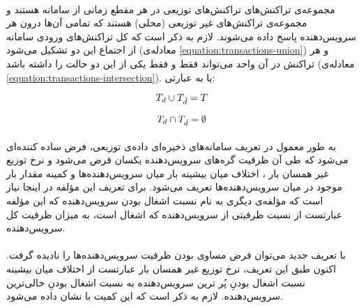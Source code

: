 \paragraph*{}
مجموعه‌ی تراکنش‌های
\lr{$ \distributedTransactions $}
تراکنش‌های توزیعی در هر مقطع زمانی از سامانه هستند و مجموعه‌ی
\lr{$ \nonDistributedTransactions $}
تراکنش‌های غیر توزیعی (محلی) هستند که تمامی آن‌ها درون هر سرویس‌دهنده پاسخ داده می‌شوند. لازم به ذکر است که کل تراکنش‌های ورودی سامانه از اجتماع این دو تشکیل می‌شود (معادله‌ی
\ref{equation:transactions-union})
و هر تراکنش در آن واحد می‌تواند فقط و فقط یکی از این دو حالت را داشته باشد (معادله‌ی
\ref{equation:transactions-intersection}).
یا به عبارتی:

\begin{latin}
	\begin{equation} \label{equation:transactions-union}
		T_{d} \cup T_{\hat{d}} = T
	\end{equation}
\end{latin}

\begin{latin}
	\begin{equation} \label{equation:transactions-intersection}
		T_{d} \cap T_{\hat{d}} = \emptyset
	\end{equation}
\end{latin}

\paragraph*{}
به طور معمول در تعریف سامانه‌های ذخیره‌ای داده‌ی توزیعی، فرض ساده کننده‌ای می‌شود که طی آن ظرفیت گره‌های سرویس‌دهنده یکسان فرض می‌شود و نرخ توزیع غیر همسان بار
،
اختلاف میان بیشینه بار میان سرویس‌دهنده‌ها و کمینه مقدار بار موجود در میان سرویس‌دهنده‌ها تعریف می‌شود. برای تعریف این مؤلفه در اینجا نیاز است که مؤلفه‌ی دیگری به نام نسبت اشغال بودن سرویس‌دهنده که این مؤلفه عبارتست از نسبت ظرفیتی از سرویس‌دهنده که اشغال است، به میزان ظرفیت کل سرویس‌دهنده.

\paragraph*{}
با تعریف جدید می‌توان فرض مساوی بودن ظرفیت سرویس‌دهنده‌ها را نادیده گرفت. اکنون طبق این تعریف، نرخ توزیع غیر همسان بار عبارتست از اختلاف میان بیشینه نسبت اشغال بودنِ پُر ترین سرویس‌دهنده به نسبت اشغال بودنِ خالی‌ترین سرویس‌دهنده. لازم به ذکر است که این کمیت با
\lr{$ \imbalanceRatio $}
نشان داده می‌شود.

